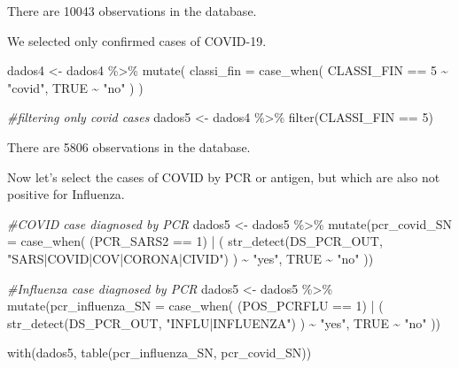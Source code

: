\documentclass[
]{article}
\newenvironment{Shaded}{\begin{snugshade}}{\end{snugshade}}
\newcommand{\AttributeTok}[1]{\textcolor[rgb]{0.77,0.63,0.00}{#1}}
\newcommand{\CommentTok}[1]{\textcolor[rgb]{0.56,0.35,0.01}{\textit{#1}}}
\newcommand{\ConstantTok}[1]{\textcolor[rgb]{0.00,0.00,0.00}{#1}}
\newcommand{\DecValTok}[1]{\textcolor[rgb]{0.00,0.00,0.81}{#1}}
\newcommand{\FunctionTok}[1]{\textcolor[rgb]{0.00,0.00,0.00}{#1}}
\newcommand{\NormalTok}[1]{#1}
\newcommand{\OtherTok}[1]{\textcolor[rgb]{0.56,0.35,0.01}{#1}}
\newcommand{\SpecialCharTok}[1]{\textcolor[rgb]{0.00,0.00,0.00}{#1}}
\newcommand{\StringTok}[1]{\textcolor[rgb]{0.31,0.60,0.02}{#1}}
\begin{document}
There are 10043 observations in the database.

We selected only confirmed cases of COVID-19.

\begin{Shaded}
\begin{Highlighting}[]
\NormalTok{dados4 }\OtherTok{\textless{}{-}}\NormalTok{ dados4 }\SpecialCharTok{\%\textgreater{}\%} 
  \FunctionTok{mutate}\NormalTok{(}
    \AttributeTok{classi\_fin =} \FunctionTok{case\_when}\NormalTok{(}
\NormalTok{      CLASSI\_FIN }\SpecialCharTok{==} \DecValTok{5} \SpecialCharTok{\textasciitilde{}} \StringTok{"covid"}\NormalTok{,}
      \ConstantTok{TRUE} \SpecialCharTok{\textasciitilde{}} \StringTok{"no"}
\NormalTok{    )}
\NormalTok{  )}


\CommentTok{\#filtering only covid cases }
\NormalTok{dados5 }\OtherTok{\textless{}{-}}\NormalTok{ dados4 }\SpecialCharTok{\%\textgreater{}\%} 
    \FunctionTok{filter}\NormalTok{(CLASSI\_FIN }\SpecialCharTok{==} \DecValTok{5}\NormalTok{)}
\end{Highlighting}
\end{Shaded}

There are 5806 observations in the database.

Now let's select the cases of COVID by PCR or antigen, but which are
also not positive for Influenza.

\begin{Shaded}
\begin{Highlighting}[]
\CommentTok{\#COVID case diagnosed by PCR}
\NormalTok{dados5 }\OtherTok{\textless{}{-}}\NormalTok{ dados5 }\SpecialCharTok{\%\textgreater{}\%}
  \FunctionTok{mutate}\NormalTok{(}\AttributeTok{pcr\_covid\_SN =} \FunctionTok{case\_when}\NormalTok{(}
\NormalTok{    (PCR\_SARS2 }\SpecialCharTok{==} \DecValTok{1}\NormalTok{) }\SpecialCharTok{|}
\NormalTok{      (}
        \FunctionTok{str\_detect}\NormalTok{(DS\_PCR\_OUT, }\StringTok{"SARS|COVID|COV|CORONA|CIVID"}\NormalTok{) }
\NormalTok{      ) }\SpecialCharTok{\textasciitilde{}} \StringTok{"yes"}\NormalTok{,  }
    \ConstantTok{TRUE} \SpecialCharTok{\textasciitilde{}} \StringTok{"no"}  
\NormalTok{  ))}

\CommentTok{\#Influenza case diagnosed by PCR }
\NormalTok{dados5 }\OtherTok{\textless{}{-}}\NormalTok{ dados5 }\SpecialCharTok{\%\textgreater{}\%}
  \FunctionTok{mutate}\NormalTok{(}\AttributeTok{pcr\_influenza\_SN =} \FunctionTok{case\_when}\NormalTok{(}
\NormalTok{    (POS\_PCRFLU }\SpecialCharTok{==} \DecValTok{1}\NormalTok{) }\SpecialCharTok{|}
\NormalTok{      (}
        \FunctionTok{str\_detect}\NormalTok{(DS\_PCR\_OUT, }\StringTok{"INFLU|INFLUENZA"}\NormalTok{) }
\NormalTok{      ) }\SpecialCharTok{\textasciitilde{}} \StringTok{"yes"}\NormalTok{, }
    \ConstantTok{TRUE} \SpecialCharTok{\textasciitilde{}} \StringTok{"no"}  
\NormalTok{  ))}

\FunctionTok{with}\NormalTok{(dados5, }\FunctionTok{table}\NormalTok{(pcr\_influenza\_SN, pcr\_covid\_SN))}
\end{Highlighting}
\end{Shaded}
\end{document}
